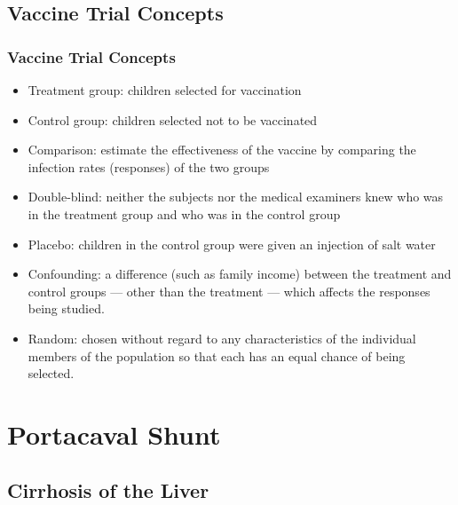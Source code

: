 \documentclass[t,xcolor=pst,dvips]{beamer}
\begin{document}
\subsection{Vaccine Trial Concepts}
\begin{frame}[t]\frametitle{Vaccine Trial Concepts}

{\small\begin{itemize}
\item Treatment group: children  selected for vaccination
\item Control group: children  selected not to be vaccinated
\item Comparison:  estimate the effectiveness of the vaccine by 
  comparing the infection rates (responses) of the two groups
\item Double-blind:  neither the subjects nor the medical examiners knew who was in the treatment group and 
who was in the control group
\item Placebo: children in the control group were given an injection of salt water
\item Confounding:  a difference (such as family income)
   between the treatment and control groups --- other than the treatment ---
   which affects the responses being studied.
\item Random:  chosen without regard to any characteristics of the 
  individual members of the population so that each has an equal chance of being 
  selected.
\end{itemize}}
\end{frame}


\section{Portacaval Shunt}

\subsection{Cirrhosis of the Liver}
\end{document}
